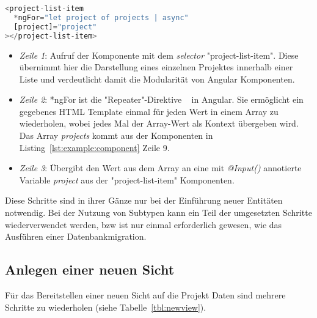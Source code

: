 \begin{lstlisting}[language=JavaScript,float=h!,caption={Funktion zum Abruf aller Projekte vom Server}, label={lst:example:service}]
<project-list-item
  *ngFor="let project of projects | async"
  [project]="project"
></project-list-item>
\end{lstlisting}

\begin{itemize}
    \setlength\itemsep{-1em}
    \item \emph{Zeile 1}: Aufruf der Komponente mit dem \emph{selector} "project-list-item".
    Diese übernimmt hier die Darstellung eines einzelnen Projektes innerhalb einer Liste und verdeutlicht damit
    die Modularität von Angular Komponenten.
    \item \emph{Zeile 2}: *ngFor ist die "Repeater"-Direktive ~\cite{ng-for} in Angular.
    Sie ermöglicht ein gegebenes HTML Template einmal für jeden Wert in einem Array zu wiederholen,
    wobei jedes Mal der Array-Wert als Kontext übergeben wird. Das Array \emph{projects} kommt aus der Komponenten in Listing~\ref{lst:example:component} Zeile 9.
    \item \emph{Zeile 3}: Übergibt den Wert aus dem Array an eine mit \emph{@Input()} annotierte Variable \emph{project} aus der "project-list-item" Komponenten.
\end{itemize}

Diese Schritte sind in ihrer Gänze nur bei der Einführung neuer Entitäten notwendig.
Bei der Nutzung von Subtypen kann ein Teil der umgesetzten Schritte wiederverwendet werden,
bzw ist nur einmal erforderlich gewesen, wie das Ausführen einer Datenbankmigration.

\subsection{Anlegen einer neuen Sicht}
\label{sec:requirements:example:newview}

Für das Bereitstellen einer neuen Sicht auf die Projekt Daten sind mehrere Schritte zu wiederholen (siehe Tabelle~\ref{tbl:newview}).

